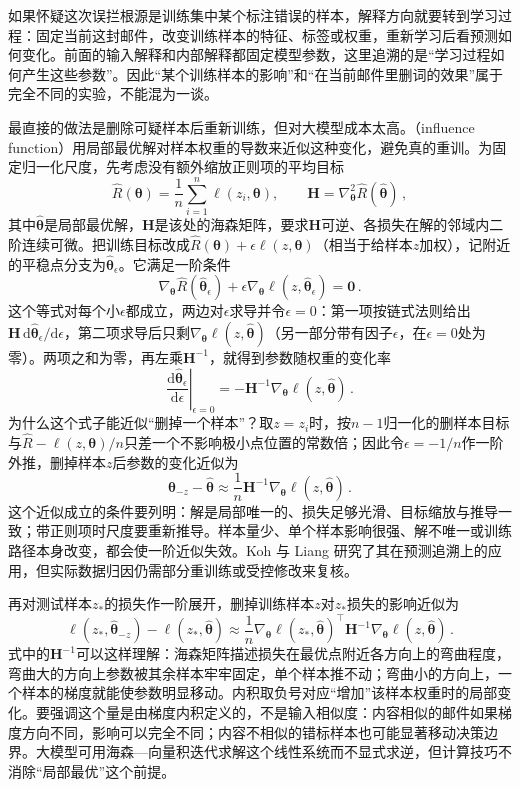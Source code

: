 如果怀疑这次误拦根源是训练集中某个标注错误的样本，解释方向就要转到学习过程：固定当前这封邮件，改变训练样本的特征、标签或权重，重新学习后看预测如何变化。前面的输入解释和内部解释都固定模型参数，这里追溯的是“学习过程如何产生这些参数”。因此“某个训练样本的影响”和“在当前邮件里删词的效果”属于完全不同的实验，不能混为一谈。

最直接的做法是删除可疑样本后重新训练，但对大模型成本太高。（influence function）用局部最优解对样本权重的导数来近似这种变化，避免真的重训。为固定归一化尺度，先考虑没有额外缩放正则项的平均目标
\[
 \hat R(\bm{\theta})=\frac1n\sum_{i=1}^n\ell(z_i,\bm{\theta}),
 \qquad
 \bm H=\nabla_{\bm{\theta}}^2\hat R(\hat{\bm{\theta}})\, ,
\]
其中$\hat{\bm{\theta}}$是局部最优解，$\bm H$是该处的海森矩阵，要求$\bm H$可逆、各损失在解的邻域内二阶连续可微。把训练目标改成$\hat R(\bm\theta)+\epsilon\ell(z,\bm\theta)$（相当于给样本$z$加权），记附近的平稳点分支为$\hat{\bm\theta}_\epsilon$。它满足一阶条件
\[
 \nabla_{\bm\theta}\hat R(\hat{\bm\theta}_\epsilon)
 +\epsilon\nabla_{\bm\theta}\ell(z,\hat{\bm\theta}_\epsilon)=\bm 0\, .
\]
这个等式对每个小$\epsilon$都成立，两边对$\epsilon$求导并令$\epsilon=0$：第一项按链式法则给出$\bm H\,\mathrm d\hat{\bm\theta}_\epsilon/\mathrm d\epsilon$，第二项求导后只剩$\nabla_{\bm\theta}\ell(z,\hat{\bm\theta})$（另一部分带有因子$\epsilon$，在$\epsilon=0$处为零）。两项之和为零，再左乘$\bm H^{-1}$，就得到参数随权重的变化率
\[
 \left.\frac{\mathrm d\hat{\bm{\theta}}_\epsilon}
 {\mathrm d\epsilon}\right|_{\epsilon=0}
 =-\bm H^{-1}\nabla_{\bm{\theta}}
       \ell(z,\hat{\bm{\theta}})\, .
\]
为什么这个式子能近似“删掉一个样本”？取$z=z_i$时，按$n-1$归一化的删样本目标与$\hat R-\ell(z,\bm\theta)/n$只差一个不影响极小点位置的常数倍；因此令$\epsilon=-1/n$作一阶外推，删掉样本$z$后参数的变化近似为
\[
 \hat{\bm{\theta}}_{-z}-\hat{\bm{\theta}}
 \approx\frac1n\bm H^{-1}\nabla_{\bm{\theta}}
 \ell(z,\hat{\bm{\theta}})\, .
\]
这个近似成立的条件要列明：解是局部唯一的、损失足够光滑、目标缩放与推导一致；带正则项时尺度要重新推导。样本量少、单个样本影响很强、解不唯一或训练路径本身改变，都会使一阶近似失效。Koh 与 Liang 研究了其在预测追溯上的应用，但实际数据归因仍需部分重训练或受控修改来复核。

再对测试样本$z_*$的损失作一阶展开，删掉训练样本$z$对$z_*$损失的影响近似为
\[
 \ell(z_*,\hat{\bm{\theta}}_{-z})
 -\ell(z_*,\hat{\bm{\theta}})
 \approx\frac1n\nabla_{\bm\theta}\ell(z_*,\hat{\bm\theta})^\top
 \bm H^{-1}\nabla_{\bm\theta}\ell(z,\hat{\bm\theta})\, .
\]
式中的$\bm H^{-1}$可以这样理解：海森矩阵描述损失在最优点附近各方向上的弯曲程度，弯曲大的方向上参数被其余样本牢牢固定，单个样本推不动；弯曲小的方向上，一个样本的梯度就能使参数明显移动。内积取负号对应“增加”该样本权重时的局部变化。要强调这个量是由梯度内积定义的，不是输入相似度：内容相似的邮件如果梯度方向不同，影响可以完全不同；内容不相似的错标样本也可能显著移动决策边界。大模型可用海森—向量积迭代求解这个线性系统而不显式求逆，但计算技巧不消除“局部最优”这个前提。


